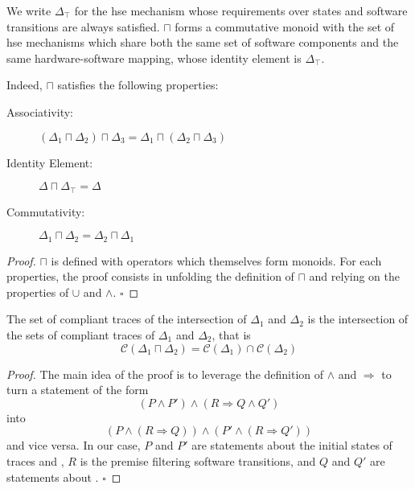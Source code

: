 \begin{lemma}
  We write $\Delta_\top$ for the \ac{hse} mechanism whose requirements over
  states and software transitions are always satisfied.
  \( \sqcap \) forms a commutative monoid with the set of \ac{hse} mechanisms
  which share both the same set of software components and the same
  hardware-software mapping, whose identity element is \( \Delta_\top \).

  Indeed, \( \sqcap \) satisfies the following properties:

  \begin{description}
  \item [Associativity:]
    \( (\Delta_1 \sqcap \Delta_2) \sqcap \Delta_3 = \Delta_1 \sqcap (\Delta_2
    \sqcap \Delta_3) \)
  \item [Identity Element:] \( \Delta \sqcap \Delta_\top = \Delta \)
  \item [Commutativity:]
    \( \Delta_1 \sqcap \Delta_2 = \Delta_2 \sqcap \Delta_1 \)
  \end{description}

  \begin{proof}
    \( \sqcap \) is defined with operators which themselves form monoids.
    For each properties, the proof consists in unfolding the definition of
    \( \sqcap \) and relying on the properties of \( \cup \) and \( \wedge \).
    \hfill \( \square \)
  \end{proof}
\end{lemma}

\begin{lemma}
  \label{lemma:speccert:compinter}
  The set of compliant traces of the intersection of $\Delta_1$ and $\Delta_2$
  is the intersection of the sets of compliant traces of $\Delta_1$ and
  $\Delta_2$, that is
  \[
    \mathcal{C}(\Delta_1 \sqcap \Delta_2) = \mathcal{C}(\Delta_1) \cap
    \mathcal{C}(\Delta_2)
  \]

  \begin{proof}
    The main idea of the proof is to leverage the definition of $\wedge$ and
    $\Rightarrow$ to turn a statement of the form
    \[
      (P \wedge P') \wedge (R \Rightarrow Q \wedge Q')
    \]
    into
    \[
      (P \wedge (R \Rightarrow Q)) \wedge (P' \wedge (R \Rightarrow Q'))
    \]
    and vice versa.
    In our case, $P$ and $P'$ are statements about the initial states of traces
    and , $R$ is the premise filtering software transitions,
    and $Q$ and $Q'$ are statements about .
    \hfill \( \square \)
  \end{proof}
\end{lemma}

